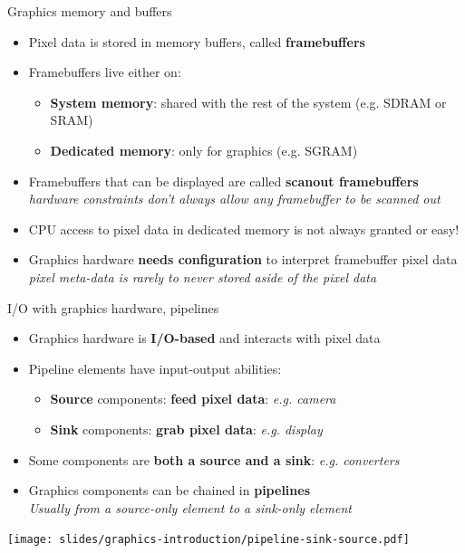 \begin{frame}{Graphics memory and buffers}
  \begin{itemize}
  \item Pixel data is stored in memory buffers, called \textbf{framebuffers}
  \item Framebuffers live either on:
    \begin{itemize}
    \item \textbf{System memory}: shared with the rest of the system (e.g. SDRAM or SRAM)
    \item \textbf{Dedicated memory}: only for graphics (e.g. SGRAM)
    \end{itemize}
  \item Framebuffers that can be displayed are called \textbf{scanout framebuffers}\\
  \textit{hardware constraints don't always allow any framebuffer to be scanned out}
  \item CPU access to pixel data in dedicated memory is not always granted or easy!
  \item Graphics hardware \textbf{needs configuration} to interpret framebuffer pixel data\\
    \textit{pixel meta-data is rarely to never stored aside of the pixel data}
  \end{itemize}
\end{frame}

\begin{frame}{I/O with graphics hardware, pipelines}
  \begin{itemize}
  \item Graphics hardware is \textbf{I/O-based} and interacts with pixel data
  \item Pipeline elements have input-output abilities:
    \begin{itemize}
    \item \textbf{Source} components: \textbf{feed pixel data}: \textit{e.g. camera}
    \item \textbf{Sink} components: \textbf{grab pixel data}: \textit{e.g. display}
    \end{itemize}
  \item Some components are \textbf{both a source and a sink}: \textit{e.g. converters}
  \item Graphics components can be chained in \textbf{pipelines}\\
    \textit{Usually from a source-only element to a sink-only element}
  \end{itemize}

  \vspace{-2em}
  \begin{center}
  \texttt{[image: slides/graphics-introduction/pipeline-sink-source.pdf]}
  \end{center}
\end{frame}

